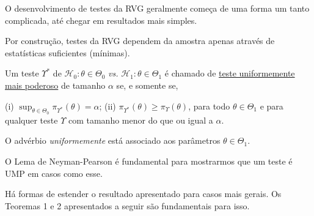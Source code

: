 \begin{note}
	\leavevmode
	\begin{outline}[enumerate]
		\1 O desenvolvimento de testes da RVG geralmente começa de uma forma um tanto complicada, até chegar em resultados mais simples.
	\end{outline}
\end{note}

\begin{note}
	\leavevmode
	\begin{outline}[enumerate]
		\1 Por construção, testes da RVG dependem da amostra apenas através de estatísticas suficientes (mínimas).
	\end{outline}
\end{note}

\begin{definition}
Um teste $\Upsilon^*$ de $\mathcal{H}_0:\theta\in\Theta_0$ \emph{vs.} $\mathcal{H}_1:\theta\in\Theta_1$ é chamado de \uline{teste uniformemente mais poderoso} de tamanho $\alpha$ se, e somente se,
\begin{outline}
\1 (i) $\sup_{\theta\in\Theta_0}\pi_{\Upsilon^*}(\theta)=\alpha$;
\1 (ii) $\pi_{\Upsilon^*}(\theta)\geq\pi_\Upsilon(\theta)$, para todo $\theta\in\Theta_1$ e para qualquer teste $\Upsilon$ com tamanho menor do que ou igual a $\alpha$.
\end{outline}
\end{definition}

\begin{note}
	\leavevmode
	\begin{outline}[enumerate]
		\1 O advérbio \emph{uniformemente} está associado aos parâmetros $\theta\in\Theta_1$.
	\end{outline}
\end{note}

O Lema de Neyman-Pearson é fundamental para mostrarmos que um teste é UMP em casos como esse.

Há formas de estender o resultado apresentado para casos mais gerais. Os Teoremas 1 e 2 apresentados a seguir são fundamentais para isso.

